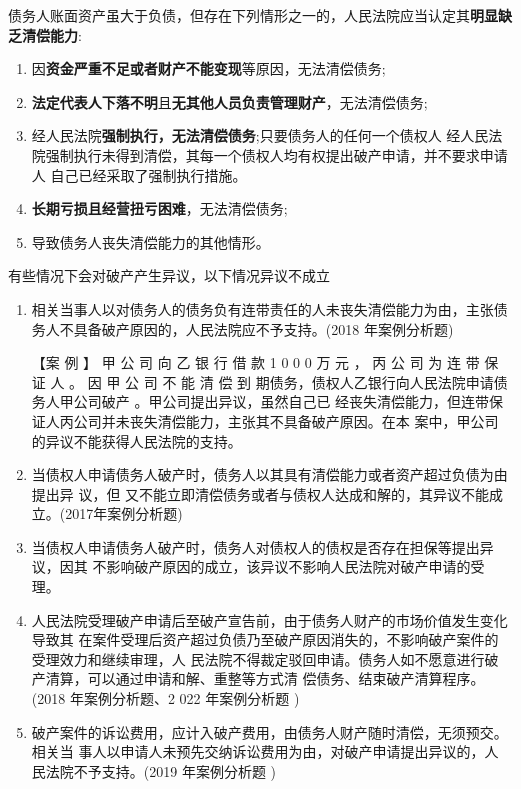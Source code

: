 \documentclass[UTF8,12pt]{ctexart}
\numberwithin{equation}{section} %
\numberwithin{figure}{section}
\numberwithin{table}{section}
\begin{document}
	债务人账面资产虽大于负债，但存在下列情形之一的，人民法院应当认定其\textbf{明显缺乏清偿能力}: 
	\begin{enumerate}
		\item 因\textbf{资金严重不足或者财产不能变现}等原因，无法清偿债务; 
		
		\item \textbf{法定代表人下落不明}且\textbf{无其他人员负责管理财产}，无法清偿债务;
		
		\item 经人民法院\textbf{强制执行，无法清偿债务};只要债务人的任何一个债权人 经人民法院强制执行未得到清偿，其每一个债权人均有权提出破产申请，并不要求申请人 自己已经采取了强制执行措施。
		
		\item \textbf{长期亏损且经营扭亏困难}，无法清偿债务;
		
		\item 导致债务人丧失清偿能力的其他情形。
	\end{enumerate}

	
	有些情况下会对破产产生异议，以下情况异议不成立
	\begin{enumerate}
		\item  相关当事人以对债务人的债务负有连带责任的人未丧失清偿能力为由，主张债务人不具备破产原因的，人民法院应不予支持。(2018 年案例分析题)
		
		【案 例 】 甲 公 司 向 乙 银 行 借 款 1 0 0 0 万 元 ， 丙 公 司 为 连 带 保 证 人 。 因 甲 公 司 不 能 清 偿 到 期债务，债权人乙银行向人民法院申请债务人甲公司破产 。甲公司提出异议，虽然自己已 经丧失清偿能力，但连带保证人丙公司并未丧失清偿能力，主张其不具备破产原因。在本 案中，甲公司的异议不能获得人民法院的支持。
		
		\item 当债权人申请债务人破产时，债务人以其具有清偿能力或者资产超过负债为由提出异 议，但 又不能立即清偿债务或者与债权人达成和解的，其异议不能成立。(2017年案例分析题) 
		
		\item 当债权人申请债务人破产时，债务人对债权人的债权是否存在担保等提出异议，因其 不影响破产原因的成立，该异议不影响人民法院对破产申请的受理。
		
		\item 人民法院受理破产申请后至破产宣告前，由于债务人财产的市场价值发生变化导致其 在案件受理后资产超过负债乃至破产原因消失的，不影响破产案件的受理效力和继续审理，人 民法院不得裁定驳回申请。债务人如不愿意进行破产清算，可以通过申请和解、重整等方式清 偿债务、结束破产清算程序。(2018 年案例分析题、2 022 年案例分析题 )
		
		\item 破产案件的诉讼费用，应计入破产费用，由债务人财产随时清偿，无须预交。相关当 事人以申请人未预先交纳诉讼费用为由，对破产申请提出异议的，人民法院不予支持。(2019 年案例分析题 )
	\end{enumerate}
	
\end{document}
